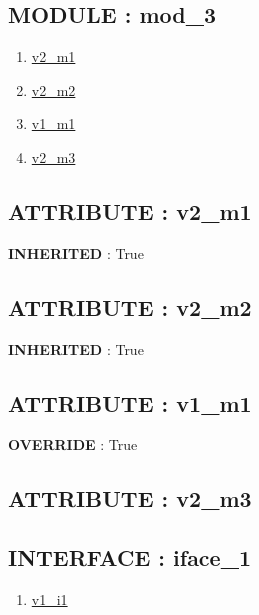 \subsection*{MODULE : mod\_3}
\hypertarget{ecldoc:intest.example_2_intest.example_2.mod_3}{}
\begin{enumerate}
\item \hyperlink{ecldoc:intest.example_2_intest.example_2.mod_1.v2_m1}{v2\_m1}
\item \hyperlink{ecldoc:intest.example_2_intest.example_2.mod_2.v2_m2}{v2\_m2}
\item \hyperlink{ecldoc:intest.example_2_intest.example_2.mod_3.v1_m1}{v1\_m1}
\item \hyperlink{ecldoc:intest.example_2_intest.example_2.mod_3.v2_m3}{v2\_m3}
\end{enumerate}
\subsection*{ATTRIBUTE : v2\_m1}
\hypertarget{ecldoc:intest.example_2_intest.example_2.mod_1.v2_m1}{}
\textbf{INHERITED} : True \\
\subsection*{ATTRIBUTE : v2\_m2}
\hypertarget{ecldoc:intest.example_2_intest.example_2.mod_2.v2_m2}{}
\textbf{INHERITED} : True \\
\subsection*{ATTRIBUTE : v1\_m1}
\hypertarget{ecldoc:intest.example_2_intest.example_2.mod_3.v1_m1}{}
\textbf{OVERRIDE} : True \\
\subsection*{ATTRIBUTE : v2\_m3}
\hypertarget{ecldoc:intest.example_2_intest.example_2.mod_3.v2_m3}{}

\subsection*{INTERFACE : iface\_1}
\hypertarget{ecldoc:intest.example_2_intest.example_2.iface_1}{}
\begin{enumerate}
\item \hyperlink{ecldoc:intest.example_2_intest.example_2.iface_1.v1_i1}{v1\_i1}
\end{enumerate}
